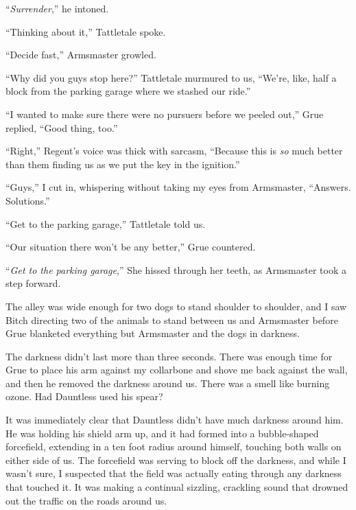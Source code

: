 ``\emph{Surrender},'' he intoned.



``Thinking about it,'' Tattletale spoke.



``Decide fast,'' Armsmaster growled.



``Why did you guys stop here?'' Tattletale murmured to us, ``We're, like, half a block from the parking garage where we stashed our ride.''



``I wanted to make sure there were no pursuers before we peeled out,'' Grue replied, ``Good thing, too.''



``Right,'' Regent's voice was thick with sarcasm, ``Because this is \emph{so} much better than them finding us as we put the key in the ignition.''



``Guys,'' I cut in, whispering without taking my eyes from Armsmaster, ``Answers.  Solutions.''



``Get to the parking garage,'' Tattletale told us.



``Our situation there won't be any better,'' Grue countered.



``\emph{Get to the parking garage},'' She hissed through her teeth, as Armsmaster took a step forward.



The alley was wide enough for two dogs to stand shoulder to shoulder, and I saw Bitch directing two of the animals to stand between us and Armsmaster before Grue blanketed everything but Armsmaster and the dogs in darkness.



The darkness didn't last more than three seconds.  There was enough time for Grue to place his arm against my collarbone and shove me back against the wall, and then he removed the darkness around us.  There was a smell like burning ozone.  Had Dauntless used his spear?



It was immediately clear that Dauntless didn't have much darkness around him.  He was holding his shield arm up, and it had formed into a bubble-shaped forcefield, extending in a ten foot radius around himself, touching both walls on either side of us.  The forcefield was serving to block off the darkness, and while I wasn't sure, I suspected that the field was actually eating through any darkness that touched it.  It was making a continual sizzling, crackling sound that drowned out the traffic on the roads around us.




